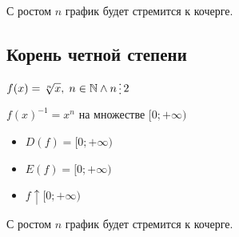 \begin{remark}
    С ростом $n$ график будет стремится к кочерге.
\end{remark}

\subsection{Корень четной степени}

$f(x) = \sqrt[n]{x}, \; n \in \mathbb{N} \land n \divisible 2$

\begin{remark}
    $f(x)^{-1} = x^n$ на множестве $[0; +\infty)$
\end{remark}

\begin{itemize}
    \item $D(f) = [0; +\infty)$
    \item $E(f) = [0; +\infty)$
    \item $f \uparrow [0; +\infty)$
\end{itemize}

\begin{remark}
    С ростом $n$ график будет стремится к кочерге.
\end{remark}


